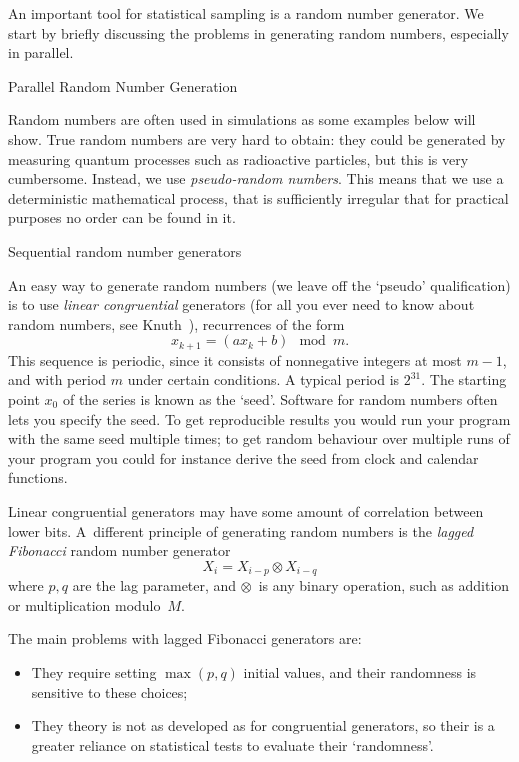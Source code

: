 An important tool for statistical sampling is a random number generator.
We start by briefly discussing the problems in generating random
numbers, especially in parallel.

 {Parallel Random Number Generation}
\label{sec:parallel-random}

Random numbers are often used in simulations as some examples below
will show. True random numbers are very hard to obtain: they could be
generated by measuring quantum processes such as radioactive
particles, but this is very cumbersome. Instead, we use
\emph{pseudo-random numbers}. This means that we use a deterministic mathematical
process, that is sufficiently irregular that for practical purposes no
order can be found in it.

 {Sequential random number generators}

An easy way to generate random numbers (we leave off the `pseudo'
qualification) is to use
\emph{linear congruential}
 generators (for all you
ever need to know about random numbers, see Knuth~\cite{Knuth:vol2}),
recurrences of the form
\[ x_{k+1} = (ax_k+b) \mod m. \]
This sequence is periodic, since it consists of nonnegative integers at most
$m-1$, and with period $m$ under certain conditions. A
typical period is $2^{31}$. The starting point $x_0$ of the series is
known as the `seed'. Software for random numbers often lets you
specify the seed. To get reproducible results you would run your
program with the same seed multiple times; to get random behaviour
over multiple runs of your program you could for instance derive the
seed from clock and calendar functions.

Linear congruential generators may have some amount of correlation
between lower bits. A~different principle of generating random numbers
is the
\emph{lagged Fibonacci}
random number generator
\[ X_i = X_{i-p}\otimes X_{i-q} \]
where $p,q$ are the lag parameter, and $\otimes$~is any binary operation,
such as addition or multiplication modulo~$M$.

The main problems with lagged Fibonacci generators are:
\begin{itemize}
\item They require setting $\max(p,q)$ initial values, and their
  randomness is sensitive to these choices;
\item They theory is not as developed as for congruential generators,
  so their is a greater reliance on statistical tests to evaluate
  their `randomness'.
\end{itemize}

